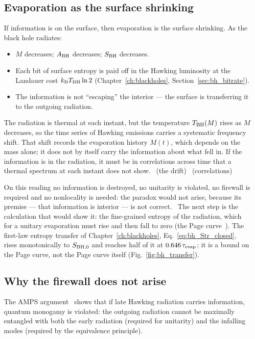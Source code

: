 \subsection{Evaporation as the surface shrinking}
If information is on the surface, then evaporation is the surface shrinking. As the black hole radiates:
\begin{itemize}
\item $M$ decreases; $A_{\rm BH}$ decreases; $S_{\rm BH}$ decreases.
\item Each bit of surface entropy is paid off in the Hawking luminosity at the Landauer cost $k_{\mathrm B} T_{\rm BH}\ln2$ (Chapter~\ref{ch:blackholes}, Section~\ref{sec:bh_bitrate}).
\item The information is not ``escaping'' the interior --- the surface is transferring it to the outgoing radiation.
\end{itemize}
The radiation is thermal at each instant, but the temperature $T_{\rm BH}(M)$ rises as $M$ decreases, so the time series of Hawking emissions carries a systematic
frequency shift. That shift records the evaporation history $M(t)$, which depends on the mass alone; it does not by itself carry the information about what
fell in. If the information is in the radiation, it must be in correlations across time that a thermal spectrum at each instant does not show. \derived\ (the
drift) \conjecture\ (correlations)

On this reading no information is destroyed, no unitarity is violated, no firewall is required and no nonlocality is needed: the paradox would not arise, because
its premise --- that information is interior --- is not correct. \interp\ The next step is the calculation that would show it: the fine-grained entropy of the radiation, which for a unitary evaporation must rise and then fall to zero (the Page curve~\cite{Page1993}). The first-law entropy transfer
of Chapter~\ref{ch:blackholes}, Eq.~\eqref{eq:bh_Str_closed}, rises monotonically to $S_{\rm BH,0}$ and reaches half of it at $0.646\,\tau_{\rm evap}$; it is a bound on the Page curve,
not the Page curve itself (Fig.~\ref{fig:bh_transfer}). \openprob

\subsection{Why the firewall does not arise}
The AMPS argument~\cite{AMPS2013} shows that if late Hawking radiation carries information, quantum monogamy is violated: the outgoing radiation cannot be maximally
entangled with both the early radiation (required for unitarity) and the infalling modes (required by the equivalence principle).


